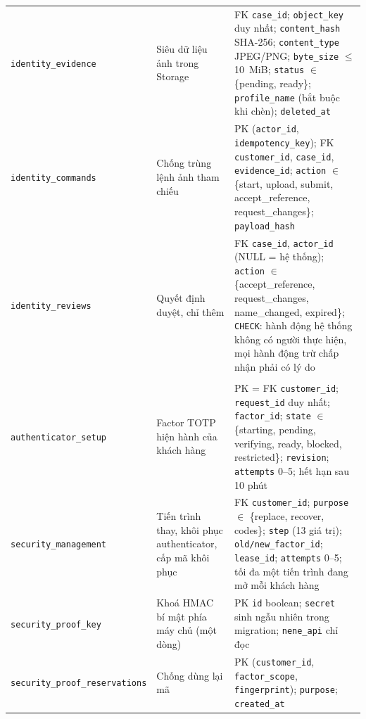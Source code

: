 {\begin{longtable}{>{\raggedright\arraybackslash}p{}>{\raggedright\arraybackslash}p{}>{\raggedright\arraybackslash}p{}}
\texttt{identity\_\allowbreak{}evidence} & Siêu dữ liệu ảnh trong Storage & FK \texttt{case\_\allowbreak{}id}; \texttt{object\_\allowbreak{}key} duy nhất; \texttt{content\_\allowbreak{}hash} SHA-256; \texttt{content\_\allowbreak{}type} JPEG/PNG; \texttt{byte\_\allowbreak{}size} $\leq$ 10~MiB; \texttt{status} $\in$ \{pending, ready\}; \texttt{profile\_\allowbreak{}name} (bắt buộc khi chèn); \texttt{deleted\_\allowbreak{}at} \\
\texttt{identity\_\allowbreak{}commands} & Chống trùng lệnh ảnh tham chiếu & PK (\texttt{actor\_\allowbreak{}id}, \texttt{idempotency\_\allowbreak{}key}); FK \texttt{customer\_\allowbreak{}id}, \texttt{case\_\allowbreak{}id}, \texttt{evidence\_\allowbreak{}id}; \texttt{action} $\in$ \{start, upload, submit, accept\_reference, request\_changes\}; \texttt{payload\_\allowbreak{}hash} \\
\texttt{identity\_\allowbreak{}reviews} & Quyết định duyệt, chỉ thêm & FK \texttt{case\_\allowbreak{}id}, \texttt{actor\_\allowbreak{}id} (NULL = hệ thống); \texttt{action} $\in$ \{accept\_reference, request\_changes, name\_changed, expired\}; \texttt{CHECK}: hành động hệ thống không có người thực hiện, mọi hành động trừ chấp nhận phải có lý do \\
\multicolumn{3}{l}{\textit{Bảo mật giao dịch}} \\
\texttt{authenticator\_\allowbreak setup} & Factor TOTP hiện hành của khách hàng & PK = FK \texttt{customer\_\allowbreak{}id}; \texttt{request\_\allowbreak{}id} duy nhất; \texttt{factor\_\allowbreak{}id}; \texttt{state} $\in$ \{starting, pending, verifying, ready, blocked, restricted\}; \texttt{revision}; \texttt{attempts} 0--5; hết hạn sau 10 phút \\
\texttt{security\_\allowbreak management} & Tiến trình thay, khôi phục authenticator, cấp mã khôi phục & FK \texttt{customer\_\allowbreak{}id}; \texttt{purpose} $\in$ \{replace, recover, codes\}; \texttt{step} (13 giá trị); \texttt{old/\allowbreak{}new\_\allowbreak{}factor\_\allowbreak{}id}; \texttt{lease\_\allowbreak{}id}; \texttt{attempts} 0--5; tối đa một tiến trình đang mở mỗi khách hàng \\
\texttt{security\_\allowbreak{}proof\_\allowbreak{}key} & Khoá HMAC bí mật phía máy chủ (một dòng) & PK \texttt{id} boolean; \texttt{secret} sinh ngẫu nhiên trong migration; \texttt{nene\_\allowbreak{}api} chỉ đọc \\
\texttt{security\_proof\_\allowbreak reservations} & Chống dùng lại mã & PK (\texttt{customer\_\allowbreak{}id}, \texttt{factor\_\allowbreak{}scope}, \texttt{fingerprint}); \texttt{purpose}; \texttt{created\_\allowbreak{}at} \\

\end{longtable}}
